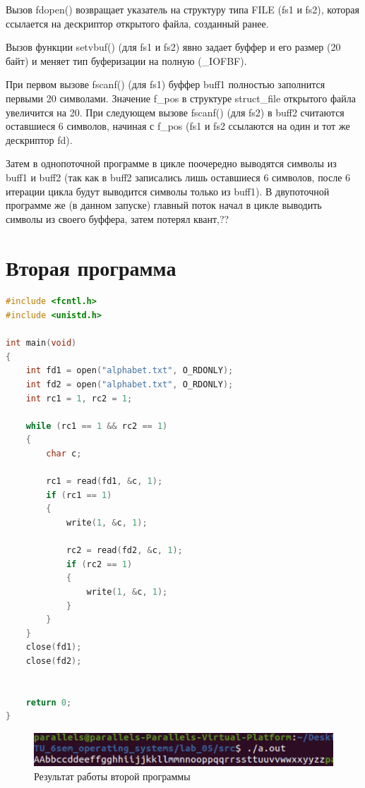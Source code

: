 \documentclass[12pt]{report}
\begin{document}
Вызов fdopen() возвращает указатель на структуру типа FILE (fs1 и fs2), которая ссылается на дескриптор открытого файла, созданный ранее. 
	
Вызов функции setvbuf() (для fs1 и fs2)  явно задает буффер и его размер (20 байт) и меняет тип буферизации на полную (\_IOFBF).

При первом вызове fscanf()  (для fs1) буффер buff1 полностью заполнится первыми 20 символами. Значение f\_pos в структуре struct\_file открытого файла увеличится на 20. При следующем вызове fscanf() (для fs2) в buff2 считаются оставшиеся 6 символов, начиная с f\_pos (fs1 и fs2 ссылаются на один и тот же дескриптор fd).


Затем в однопоточной программе в цикле поочередно выводятся символы из buff1 и buff2 (так как в buff2 записались лишь оставшиеся 6 символов, после 6 итерации цикла будут выводится символы только из buff1). В двупоточной программе же (в данном запуске) главный поток начал в цикле выводить символы из своего буффера, затем потерял квант,??




\chapter{Вторая программа}

\begin{lstlisting}[language=c, label=p2, caption=Вторая программа]
#include <fcntl.h>
#include <unistd.h>

int main(void)
{
    int fd1 = open("alphabet.txt", O_RDONLY);
    int fd2 = open("alphabet.txt", O_RDONLY);
    int rc1 = 1, rc2 = 1;

    while (rc1 == 1 && rc2 == 1)
    {
        char c;

        rc1 = read(fd1, &c, 1);
        if (rc1 == 1)
        {
            write(1, &c, 1);

            rc2 = read(fd2, &c, 1);
            if (rc2 == 1)
            {
                write(1, &c, 1);
            }
        }
    }
    close(fd1);
    close(fd2);


    return 0;
}
\end{lstlisting}

\begin{figure}[H]
	\centering
	\includegraphics[scale=0.9]{img/prog_02.png}
	\caption{Результат работы второй программы}
	\label{fig:prog_02}
\end{figure}
\end{document}
